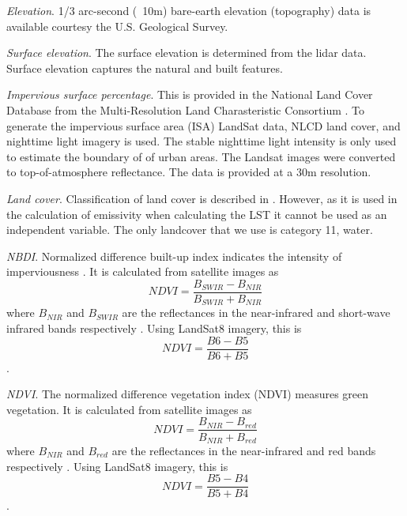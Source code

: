 \documentclass[final,3p,times,twocolumn,sort&compress]{elsarticle}
\begin{document}

\textit{Elevation}. 1/3 arc-second (~10m) bare-earth elevation (topography) data is available courtesy the U.S. Geological Survey. 

\textit{Surface elevation}. The surface elevation is determined from the lidar data. Surface elevation captures the natural and built features. 

\textit{Impervious surface percentage}. This is provided in the National Land Cover Database from the Multi-Resolution Land Charasteristic Consortium \cite{Xian2011-aa}. To generate the impervious surface area (ISA) LandSat data, NLCD land cover, and nighttime light imagery is used. The stable nighttime light intensity is only used to estimate the boundary of of urban areas. The Landsat images were converted to top-of-atmosphere reflectance. The data is provided at a 30m resolution.

\textit{Land cover}. 
Classification of land cover is described in \cite{Homer2015-ce}. 
However, as it is used in the calculation of emissivity when calculating the LST it cannot be used as an independent variable. 
The only landcover that we use is category 11, water. 

\textit{NBDI}. 
Normalized difference built-up index indicates the intensity of imperviousness \cite{Bhatti2014-ae}. 
It is calculated from satellite images as $$NDVI=\frac{B_{SWIR}-B_{NIR}}{B_{SWIR}+B_{NIR}}$$ where $B_{NIR}$ and $B_{SWIR}$ are the reflectances in the near-infrared and short-wave infrared bands respectively \cite{Alhawiti2016-wv}. 
Using LandSat8 imagery, this is $$NDVI=\frac{B6-B5}{B6+B5}$$ \cite{barsi2014}.

\textit{NDVI}. 
The normalized difference vegetation index (NDVI) measures green vegetation. 
It is calculated from satellite images as $$NDVI=\frac{B_{NIR}-B_{red}}{B_{NIR}+B_{red}}$$ where $B_{NIR}$ and $B_{red}$ are the reflectances in the near-infrared and red bands respectively \cite{Alhawiti2016-wv}. 
Using LandSat8 imagery, this is $$NDVI=\frac{B5-B4}{B5+B4}$$ \cite{barsi2014}.

\end{document}

